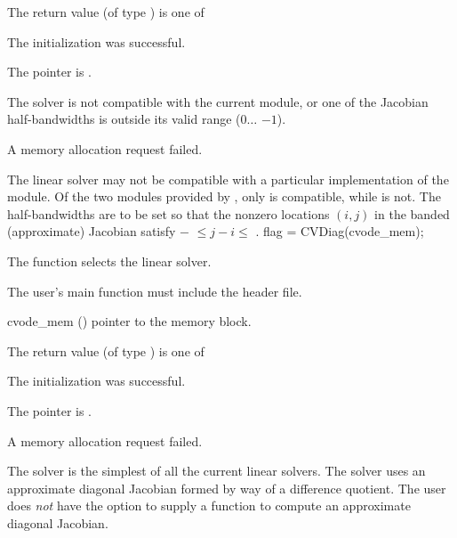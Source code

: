 {
  The return value  (of type ) is one of
  \begin{args}
  \item[\Id{SUCCESS}] 
    The {\cvband} initialization was successful.
  \item[\Id{LIN\_NO\_MEM}]
    The  pointer is .
  \item[\Id{LIN\_ILL\_INPUT}]
    The {\cvband} solver is not compatible with the current {\nvector} module, or
    one of the Jacobian half-bandwidths is outside its valid range ($0 \ldots$ $-1$).
  \item[\Id{LMEM\_FAIL}]
    A memory allocation request failed.
  \end{args}
}
{
  The {\cvband} linear solver may not be compatible with a particular
  implementation of the {\nvector} module. Of the two {\nvector} modules 
  provided by {\sundials}, only {\nvecs} is compatible, while {\nvecp} is not.
  The half-bandwidths are to be set so that the nonzero locations $(i,j)$ in the
  banded (approximate) Jacobian satisfy $-$ $\leq j-i \leq$ .
}
{
  flag = CVDiag(cvode\_mem);
}
{
  The function  selects the {\cvdiag} linear solver. 

  The user's main function must include the  header file.
}
{
  \begin{args}
  \item[cvode\_mem] ()
    pointer to the {\cvodes} memory block.
  \end{args}
}
{
  The return value  (of type ) is one of
  \begin{args}
  \item[\Id{SUCCESS}]
    The {\cvdiag} initialization was successful.
  \item[\Id{LIN\_NO\_MEM}]
    The  pointer is .
  \item[\Id{LMEM\_FAIL}]
    A memory allocation request failed.
  \end{args}
}
{
  The {\cvdiag} solver is the simplest of all the current {\cvodes} linear
  solvers. 
  The {\cvdiag} solver uses an approximate diagonal Jacobian formed by way of a difference 
  quotient. The user does {\em not} have the option to supply a function to compute
  an approximate diagonal Jacobian.
}
